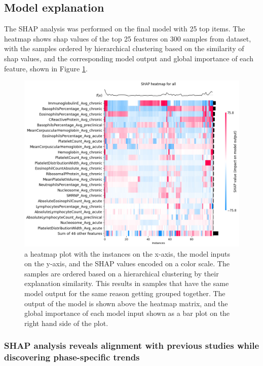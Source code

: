 \documentclass[final,1p,times,authoryear]{elsarticle}
\begin{document}
\subsection{Model explanation}\label{ModelExplanationResults}
The SHAP analysis was performed on the final model with 25 top items. The heatmap shows shap values of the top 25 features on 300 samples from dataset, with the samples ordered by hierarchical clustering based on the similarity of shap values, and the corresponding model output and global importance of each feature, shown in Figure \ref{heatmap_all_orderx}. 

\begin{figure}[t] 
    \centering
    \includegraphics[width=\textwidth]{figures/heatmap_all_orderx.png}
    \caption{a heatmap plot with the instances on the x-axis, the model inputs on the y-axis, and the SHAP values encoded on a color scale. The samples are ordered based on a hierarchical clustering by their explanation similarity. This results in samples that have the same model output for the same reason getting grouped together. The output of the model is shown above the heatmap matrix, and the global importance of each model input shown as a bar plot on the right hand side of the plot.}\label{heatmap_all_orderx}
\end{figure}


\subsubsection{SHAP analysis reveals alignment with previous studies while discovering phase-specific trends}
\end{document}
